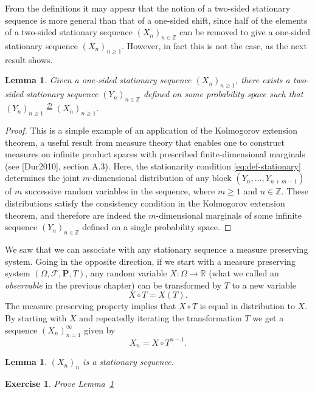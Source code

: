\documentclass[12pt]{article}
\newtheorem{lem}[thm]{Lemma}
\newtheorem{exercise}[thm]{Exercise}
\newcommand{\R}{\mathbb{R}}
\newcommand{\Z}{\mathbb{Z}}
\newcommand{\prob}{\mathbf{P}}
\theoremstyle{example}
\begin{document}
From the definitions it may appear that the notion of a two-sided stationary sequence is more general than that of a one-sided shift, since half of the elements of a two-sided stationary sequence $(X_n)_{n\in\Z}$ can be removed to give a one-sided stationary sequence $(X_n)_{n\ge 1}$. However, in fact this is not the case, as the next result shows.

\begin{lem} Given a one-sided stationary sequence $(X_n)_{n\ge 1}$, there exists a two-sided stationary sequence $(Y_n)_{n\in\Z}$ defined on some probability space such that $(Y_n)_{n\ge1} \stackrel{\mathcal{D}}{=} (X_n)_{n\ge1}$.
\end{lem}

\begin{proof}
This is a simple example of an application of the Kolmogorov extension theorem, a useful result from measure theory that enables one to construct measures on infinite product spaces with prescribed finite-dimensional marginals (see [Dur2010], section A.3). Here, the stationarity condition \eqref{eq:def-stationary} determines the joint $m$-dimensional distribution of any block $(Y_n,\ldots,Y_{n+m-1})$ of $m$ successive random variables in the sequence, where $m\ge1$ and $n\in\Z$. These distributions satisfy the consistency condition in the Kolmogorov extension theorem, and therefore are indeed the $m$-dimensional marginals of some infinite sequence $(Y_n)_{n\in\Z}$ defined on a single probability space.
\end{proof}

We saw that we can associate with any stationary sequence a measure preserving system. Going in the opposite direction, if we start with a measure preserving system $(\Omega, \mathcal{F}, \prob, T)$, any random variable $X:\Omega\to\R$ (what we called an \emph{observable} in the previous chapter) can be transformed by $T$ to a new variable
$$ X\circ T = X(T). $$
The measure preserving property implies that $X\circ T$ is equal in distribution to $X$. By starting with $X$ and repeatedly iterating the transformation $T$ we get a sequence $(X_n)_{n=1}^\infty$ given by
$$ X_n = X\circ T^{n-1}. $$

\begin{lem} \label{lem-mps-stationary}
$(X_n)_n$ is a stationary sequence.
\end{lem}

\begin{exercise}
Prove Lemma~\ref{lem-mps-stationary}
\end{exercise}
\end{document}
